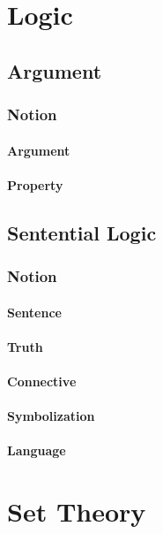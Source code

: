 \documentclass{book}
\begin{document}
\maketitle
\tableofcontents
\part{Logic}
	\chapter{Argument}
		\section{Notion}
			\subsection*{Argument}
			
			\subsection*{Property}
			
	\chapter{Sentential Logic}
		\section{Notion}
			\subsection*{Sentence}
			
			\subsection*{Truth}
			
			\subsection*{Connective}
			
			\subsection*{Symbolization}
			
			\subsection*{Language}
			

\part{Set Theory}
\end{document}
